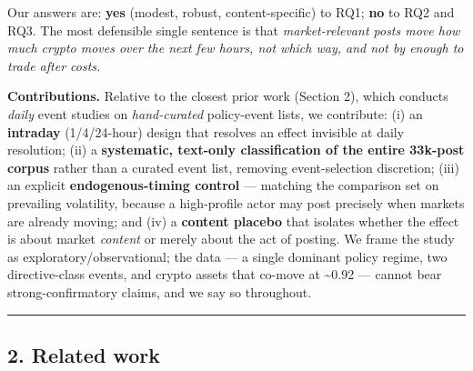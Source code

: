 \documentclass[
]{article}
\begin{document}
Our answers are: \textbf{yes} (modest, robust, content-specific) to RQ1;
\textbf{no} to RQ2 and RQ3. The most defensible single sentence is that
\emph{market-relevant posts move how much crypto moves over the next few
hours, not which way, and not by enough to trade after costs.}

\textbf{Contributions.} Relative to the closest prior work (Section 2),
which conducts \emph{daily} event studies on \emph{hand-curated}
policy-event lists, we contribute: (i) an \textbf{intraday}
(1/4/24-hour) design that resolves an effect invisible at daily
resolution; (ii) a \textbf{systematic, text-only classification of the
entire 33k-post corpus} rather than a curated event list, removing
event-selection discretion; (iii) an explicit \textbf{endogenous-timing
control} --- matching the comparison set on prevailing volatility,
because a high-profile actor may post precisely when markets are already
moving; and (iv) a \textbf{content placebo} that isolates whether the
effect is about market \emph{content} or merely about the act of
posting. We frame the study as exploratory/observational; the data --- a
single dominant policy regime, two directive-class events, and crypto
assets that co-move at \textasciitilde0.92 --- cannot bear
strong-confirmatory claims, and we say so throughout.

\begin{center}\rule{0.5\linewidth}{0.5pt}\end{center}

\subsection{2. Related work}\label{related-work}
\end{document}
